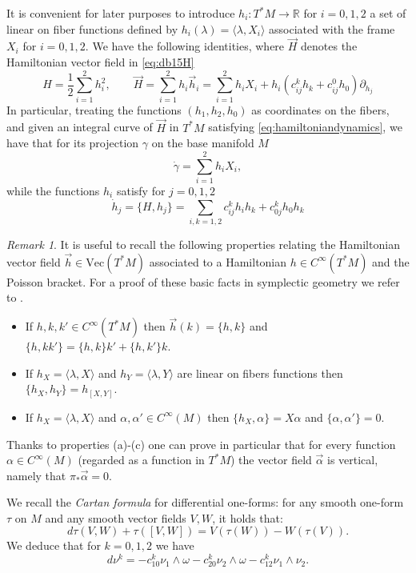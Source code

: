 \documentclass{amsart}
\theoremstyle{plain}
\theoremstyle{definition}
\theoremstyle{remark}
\newtheorem{remark}[thm]{Remark}
\newcommand{\R}{\mathbb{R}}
\newcommand{\diff}{d}%
\begin{document}
It is convenient for later purposes to introduce $h_{i}:T^{*}M\to \R$  for $i=0,1,2$ a set of linear on fiber functions defined by $h_{i}(\lambda)=\langle \lambda,X_{i}\rangle$ associated with the frame $X_{i}$ for $i=0,1,2$. We have the following identities, where $\vec H$ denotes the Hamiltonian vector field in \eqref{eq:db15H}
$$H=\frac{1}{2}\sum_{i=1}^{2}h_{i}^{2},\qquad \vec H=\sum_{i=1}^{2}h_{i}\vec h_{i}=\sum_{i=1}^{2}h_{i}X_{i}+h_{i}(c_{ij}^{k}h_{k}+c_{ij}^{0}h_{0})\partial_{h_{j}}$$
In particular, treating the functions $(h_{1},h_{2},h_{0})$ as coordinates on the fibers, and given an integral curve of $\vec H$ in $T^{*}M$ satisfying \eqref{eq:hamiltoniandynamics}, we have that for its projection $\gamma$ on the base manifold $M$ 
$$\dot \gamma=\sum_{i=1}^{2}h_{i}X_{i},$$
while the functions $h_{i}$ satisfy for $j=0,1,2$
$$\dot h_{j}=\{H,h_{j}\}=\sum_{i,k=1,2} c_{ij}^{k}h_{i}h_{k}+c_{0j}^{k}h_{0}h_{k}$$
\begin{remark}\label{r:prope} It is useful to recall the following properties relating the Hamiltonian vector field $\vec h\in \mathrm{Vec}(T^{*}M)$ associated to a Hamiltonian $h\in C^{\infty}(T^{*}M)$ and the Poisson bracket. For a proof of these basic facts in symplectic geometry we refer to \cite[Chapter 4]{thebook}.
\begin{itemize}
\item[(a)] If $h,k,k'\in C^{\infty}(T^{*}M)$ then $\vec h (k)=\{h,k\}$ and $\{h,kk'\}=\{h,k\}k'+\{h,k'\}k$. 
\item[(b)] If $h_{X}=\langle \lambda, X\rangle$ and $h_{Y}=\langle \lambda, Y\rangle$ are linear on fibers functions then $\{h_{X},h_{Y}\}=h_{[X,Y]}$.
\item[(c)] If $h_{X}=\langle \lambda, X\rangle$ and $\alpha, \alpha' \in C^{\infty}(M)$ then $\{h_{X},\alpha\}=X\alpha$ and $\{\alpha,\alpha'\}=0$.\end{itemize}
Thanks to properties (a)-(c) one can prove in particular that for every function $\alpha\in C^{\infty}(M)$ (regarded as a function in $T^{*}M$) the vector field $\vec \alpha$ is vertical, namely that $\pi_{*}\vec \alpha=0$.
\end{remark}
We recall the \emph{Cartan formula} for differential one-forms:
for any smooth one-form $\tau$ on $M$ and any smooth vector fields $V,W$, it holds that:
\begin{equation}
\label{eq:cartan}
\diff \tau(V,W)+\tau([V,W])=V(\tau(W))-W(\tau(V)).  
\end{equation} 
We deduce that for $k=0,1,2$ we have
\begin{equation}
\label{eq:cartanckij}
\diff\nu^k=-c^k_{10}\nu_1\wedge\omega -c^k_{20}\nu_2\wedge\omega -c^k_{12}\nu_1\wedge\nu_2.
\end{equation}
\end{document}
